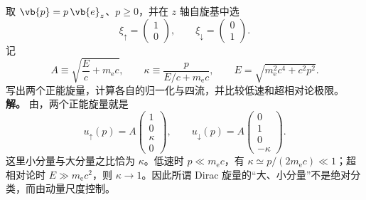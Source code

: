 

\begin{exbox}[沿 $z$ 方向运动的电子]
取 $\vb{p}=p\,\vb{e}_z$、$p\ge0$，并在 $z$ 轴自旋基中选
\begin{equation*}
 \xi_\uparrow=\begin{pmatrix}1\\0\end{pmatrix},
 \qquad
 \xi_\downarrow=\begin{pmatrix}0\\1\end{pmatrix}.
\end{equation*}
记
\begin{equation*}
 A\equiv\sqrt{\frac{E}{c}+m_{\mathrm e} c},
 \qquad
 \kappa\equiv\frac{p}{E/c+m_{\mathrm e} c},
 \qquad
 E=\sqrt{m_{\mathrm e}^2c^4+c^2p^2}.
\end{equation*}
写出两个正能旋量，计算各自的归一化与四流，并比较低速和超相对论极限。
\textbf{解。} 由，两个正能旋量就是
\begin{equation}
 u_\uparrow(p)=A
 \begin{pmatrix}1\\0\\\kappa\\0\end{pmatrix},
 \qquad
 u_\downarrow(p)=A
 \begin{pmatrix}0\\1\\0\\-\kappa\end{pmatrix}.
 \label{eq:explicit-z-spinors-dp62}
\end{equation}
这里小分量与大分量之比恰为 $\kappa$。低速时 $p\ll m_{\mathrm e} c$，有 $\kappa\simeq p/(2m_{\mathrm e} c)\ll1$；超相对论时 $E\gg m_{\mathrm e} c^2$，则 $\kappa\to1$。因此所谓 Dirac 旋量的“大、小分量”不是绝对分类，而由动量尺度控制。


\end{exbox}
